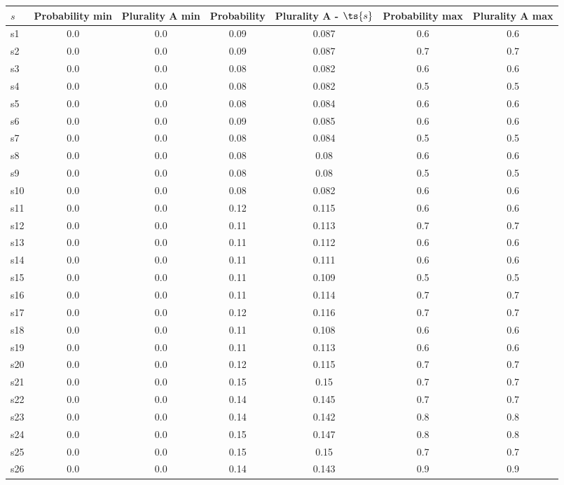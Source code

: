 \documentclass{article}
\begin{document}
\noindent\begin{tabular}{|l|c|c|c|c|c|c|}
\hline
$s$& Probability min & Plurality A min & Probability & Plurality A - $\ts{s}$ & Probability max & Plurality A max\\
\hline
s1 &0.0 & 0.0 & 0.09 & 0.087 & 0.6 & 0.6\\
\hline
s2 &0.0 & 0.0 & 0.09 & 0.087 & 0.7 & 0.7\\
\hline
s3 &0.0 & 0.0 & 0.08 & 0.082 & 0.6 & 0.6\\
\hline
s4 &0.0 & 0.0 & 0.08 & 0.082 & 0.5 & 0.5\\
\hline
s5 &0.0 & 0.0 & 0.08 & 0.084 & 0.6 & 0.6\\
\hline
s6 &0.0 & 0.0 & 0.09 & 0.085 & 0.6 & 0.6\\
\hline
s7 &0.0 & 0.0 & 0.08 & 0.084 & 0.5 & 0.5\\
\hline
s8 &0.0 & 0.0 & 0.08 & 0.08 & 0.6 & 0.6\\
\hline
s9 &0.0 & 0.0 & 0.08 & 0.08 & 0.5 & 0.5\\
\hline
s10 &0.0 & 0.0 & 0.08 & 0.082 & 0.6 & 0.6\\
\hline
s11 &0.0 & 0.0 & 0.12 & 0.115 & 0.6 & 0.6\\
\hline
s12 &0.0 & 0.0 & 0.11 & 0.113 & 0.7 & 0.7\\
\hline
s13 &0.0 & 0.0 & 0.11 & 0.112 & 0.6 & 0.6\\
\hline
s14 &0.0 & 0.0 & 0.11 & 0.111 & 0.6 & 0.6\\
\hline
s15 &0.0 & 0.0 & 0.11 & 0.109 & 0.5 & 0.5\\
\hline
s16 &0.0 & 0.0 & 0.11 & 0.114 & 0.7 & 0.7\\
\hline
s17 &0.0 & 0.0 & 0.12 & 0.116 & 0.7 & 0.7\\
\hline
s18 &0.0 & 0.0 & 0.11 & 0.108 & 0.6 & 0.6\\
\hline
s19 &0.0 & 0.0 & 0.11 & 0.113 & 0.6 & 0.6\\
\hline
s20 &0.0 & 0.0 & 0.12 & 0.115 & 0.7 & 0.7\\
\hline
s21 &0.0 & 0.0 & 0.15 & 0.15 & 0.7 & 0.7\\
\hline
s22 &0.0 & 0.0 & 0.14 & 0.145 & 0.7 & 0.7\\
\hline
s23 &0.0 & 0.0 & 0.14 & 0.142 & 0.8 & 0.8\\
\hline
s24 &0.0 & 0.0 & 0.15 & 0.147 & 0.8 & 0.8\\
\hline
s25 &0.0 & 0.0 & 0.15 & 0.15 & 0.7 & 0.7\\
\hline
s26 &0.0 & 0.0 & 0.14 & 0.143 & 0.9 & 0.9\\
\hline

\end{tabular}
\end{document}
